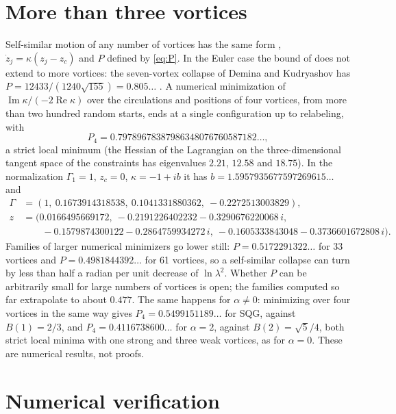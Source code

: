 \documentclass[11pt]{article}
\theoremstyle{definition}
\newcommand{\re}{\operatorname{Re}}
\newcommand{\im}{\operatorname{Im}}
\begin{document}
\section{More than three vortices}\label{sec:more}

Self-similar motion of any number of vortices has the same form \cite{dk2014,gotoda2021,oneil2007}, $\dot z_j = \kappa(z_j - z_c)$ and $P$ defined by \eqref{eq:P}. In the Euler case the bound of \cite{hendrick2026} does not extend to more vortices: the seven-vortex collapse of Demina and Kudryashov \cite[Table~1]{dk2014} has $P = 12433/(1240\sqrt{155}) = 0.805\ldots$ \cite{hendrick2026}. A numerical minimization of $\im\kappa/(-2\re\kappa)$ over the circulations and positions of four vortices, from more than two hundred random starts, ends at a single configuration up to relabeling, with
\[
P_4 = 0.79789678387986348076760587182\ldots,
\]
a strict local minimum (the Hessian of the Lagrangian on the three-dimensional tangent space of the constraints has eigenvalues $2.21$, $12.58$ and $18.75$). In the normalization $\Gamma_1 = 1$, $z_c = 0$, $\kappa = -1 + ib$ it has $b = 1.5957935677597269615\ldots$ and
\begin{align*}
\Gamma &= (1,\ 0.1673914318538,\ 0.1041331880362,\ -0.2272513003829),\\
z &= (0.0166495669172,\ -0.2191226402232 - 0.3290676220068\,i,\\
&\qquad -0.1579874300122 - 0.2864759934272\,i,\ -0.1605333843048 - 0.3736601672808\,i).
\end{align*}
Families of larger numerical minimizers go lower still: $P = 0.5172291322\ldots$ for 33 vortices and $P = 0.4981844392\ldots$ for 61 vortices, so a self-similar collapse can turn by less than half a radian per unit decrease of $\ln\lambda^2$. Whether $P$ can be arbitrarily small for large numbers of vortices is open; the families computed so far extrapolate to about $0.477$. The same happens for $\alpha \ne 0$: minimizing over four vortices in the same way gives $P_4 = 0.5499151189\ldots$ for SQG, against $B(1) = 2/3$, and $P_4 = 0.4116738600\ldots$ for $\alpha = 2$, against $B(2) = \sqrt5/4$, both strict local minima with one strong and three weak vortices, as for $\alpha = 0$. These are numerical results, not proofs.

\section{Numerical verification}\label{sec:numerics}
\end{document}
